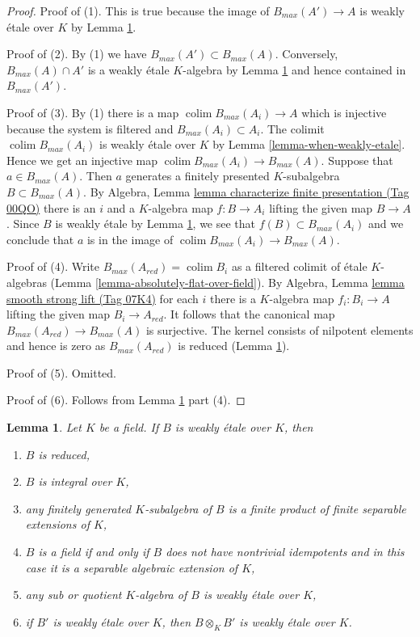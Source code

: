 \documentclass{amsart}
\theoremstyle{plain}
\newtheorem{lemma}[subsection]{Lemma}
\theoremstyle{definition}
\theoremstyle{remark}
\numberwithin{equation}{subsection}
\def\colim{\mathop{\mathrm{colim}}\nolimits}
\begin{document}
\begin{proof}
Proof of (1). This is true because the image of $B_{max}(A') \to A$
is weakly \'etale over $K$ by Lemma \ref{lemma-class-weakly-etale-over-field}.

\medskip\noindent
Proof of (2). By (1) we have $B_{max}(A') \subset B_{max}(A)$.
Conversely, $B_{max}(A) \cap A'$ is a weakly \'etale $K$-algebra
by Lemma \ref{lemma-class-weakly-etale-over-field} and hence
contained in $B_{max}(A')$.

\medskip\noindent
Proof of (3). By (1) there is a map $\colim B_{max}(A_i) \to A$
which is injective because the system is filtered and
$B_{max}(A_i) \subset A_i$. The colimit $\colim B_{max}(A_i)$
is weakly \'etale over $K$ by
Lemma \ref{lemma-when-weakly-etale}.
Hence we get an injective map $\colim B_{max}(A_i) \to B_{max}(A)$.
Suppose that $a \in B_{max}(A)$. Then $a$ generates a finitely presented
$K$-subalgebra $B \subset B_{max}(A)$.
By Algebra, Lemma \href{https://stacks.math.columbia.edu/tag/00QO}{lemma characterize finite presentation (Tag 00QO)}
there is an $i$ and a $K$-algebra map $f : B \to A_i$
lifting the given map $B \to A$.
Since $B$ is weakly \'etale by
Lemma \ref{lemma-class-weakly-etale-over-field},
we see that $f(B) \subset B_{max}(A_i)$ and we conclude that $a$
is in the image of $\colim B_{max}(A_i) \to B_{max}(A)$.

\medskip\noindent
Proof of (4). Write $B_{max}(A_{red}) = \colim B_i$
as a filtered colimit of \'etale $K$-algebras
(Lemma \ref{lemma-absolutely-flat-over-field}).
By Algebra, Lemma \href{https://stacks.math.columbia.edu/tag/07K4}{lemma smooth strong lift (Tag 07K4)}
for each $i$ there is a $K$-algebra map $f_i : B_i \to A$
lifting the given map $B_i \to A_{red}$. It follows that the
canonical map $B_{max}(A_{red}) \to B_{max}(A)$ is surjective.
The kernel consists of nilpotent elements and hence is zero
as $B_{max}(A_{red})$ is reduced
(Lemma \ref{lemma-class-weakly-etale-over-field}).

\medskip\noindent
Proof of (5). Omitted.

\medskip\noindent
Proof of (6). Follows from Lemma \ref{lemma-class-weakly-etale-over-field}
part (4).
\end{proof}


\begin{lemma}
\label{lemma-class-weakly-etale-over-field}
Let $K$ be a field. If $B$ is weakly \'etale over $K$, then
\begin{enumerate}
\item $B$ is reduced,
\item $B$ is integral over $K$,
\item any finitely generated $K$-subalgebra of $B$ is a finite product
of finite separable extensions of $K$,
\item $B$ is a field if and only if $B$ does not have nontrivial idempotents
and in this case it is a separable algebraic extension of $K$,
\item any sub or quotient $K$-algebra of $B$ is weakly \'etale over $K$,
\item if $B'$ is weakly \'etale over $K$, then $B \otimes_K B'$ is
weakly \'etale over $K$.
\end{enumerate}
\end{lemma}
\end{document}
